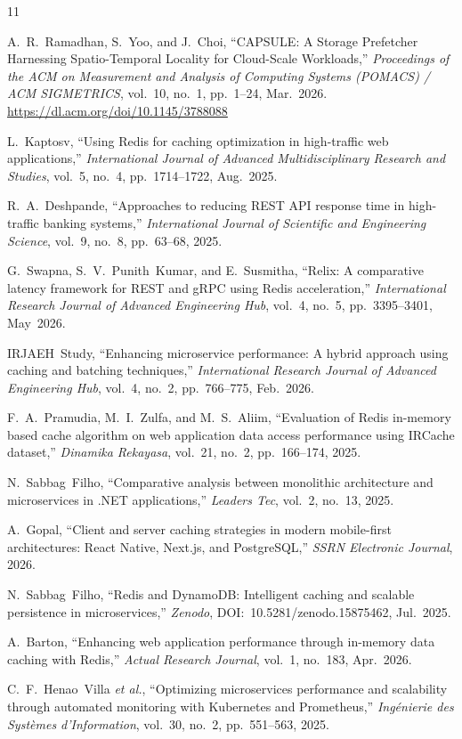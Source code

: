 \documentclass[11pt,a4paper]{article}
\begin{document}


\begin{thebibliography}{11}

A.~R.~Ramadhan, S.~Yoo, and J.~Choi,
``CAPSULE: A Storage Prefetcher Harnessing Spatio-Temporal Locality for Cloud-Scale Workloads,''
\textit{Proceedings of the ACM on Measurement and Analysis of Computing Systems (POMACS) / ACM SIGMETRICS},
vol.~10, no.~1, pp.~1--24, Mar.~2026. \url{https://dl.acm.org/doi/10.1145/3788088}

L.~Kaptosv,
``Using Redis for caching optimization in high-traffic web applications,''
\textit{International Journal of Advanced Multidisciplinary Research and Studies},
vol.~5, no.~4, pp.~1714--1722, Aug.~2025.

R.~A.~Deshpande,
``Approaches to reducing REST API response time in high-traffic banking systems,''
\textit{International Journal of Scientific and Engineering Science},
vol.~9, no.~8, pp.~63--68, 2025.

G.~Swapna, S.~V.~Punith~Kumar, and E.~Susmitha,
``Relix: A comparative latency framework for REST and gRPC using Redis acceleration,''
\textit{International Research Journal of Advanced Engineering Hub},
vol.~4, no.~5, pp.~3395--3401, May~2026.

IRJAEH~Study,
``Enhancing microservice performance: A hybrid approach using caching and batching techniques,''
\textit{International Research Journal of Advanced Engineering Hub},
vol.~4, no.~2, pp.~766--775, Feb.~2026.

F.~A.~Pramudia, M.~I.~Zulfa, and M.~S.~Aliim,
``Evaluation of Redis in-memory based cache algorithm on web application data access performance using IRCache dataset,''
\textit{Dinamika Rekayasa},
vol.~21, no.~2, pp.~166--174, 2025.

N.~Sabbag~Filho,
``Comparative analysis between monolithic architecture and microservices in .NET applications,''
\textit{Leaders Tec}, vol.~2, no.~13, 2025.

A.~Gopal,
``Client and server caching strategies in modern mobile-first architectures: React Native, Next.js, and PostgreSQL,''
\textit{SSRN Electronic Journal}, 2026.

N.~Sabbag~Filho,
``Redis and DynamoDB: Intelligent caching and scalable persistence in microservices,''
\textit{Zenodo}, DOI:~10.5281/zenodo.15875462, Jul.~2025.

A.~Barton,
``Enhancing web application performance through in-memory data caching with Redis,''
\textit{Actual Research Journal}, vol.~1, no.~183, Apr.~2026.

C.~F.~Henao~Villa \textit{et al.},
``Optimizing microservices performance and scalability through automated monitoring with Kubernetes and Prometheus,''
\textit{Ing\'{e}nierie des Syst\`{e}mes d'Information},
vol.~30, no.~2, pp.~551--563, 2025.

\end{thebibliography}
\end{document}
